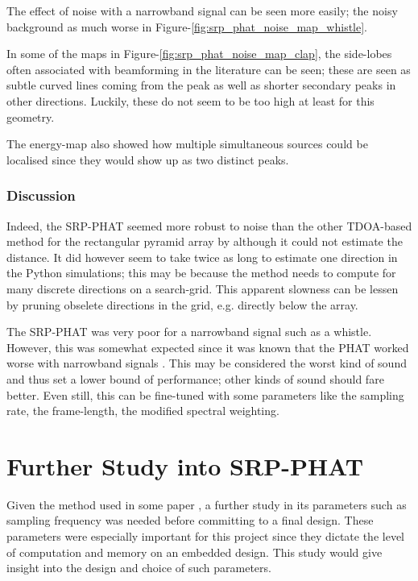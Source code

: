 \documentclass[notitlepage]{report}
\begin{document}
The effect of noise with a narrowband signal can be seen more easily; the noisy background as much worse in Figure-\ref{fig:srp_phat_noise_map_whistle}.

In some of the maps in Figure-\ref{fig:srp_phat_noise_map_clap}, the side-lobes often associated with beamforming in the literature can be seen; these are seen as subtle curved lines coming from the peak as well as shorter secondary peaks in other directions. Luckily, these do not seem to be too high at least for this geometry.

The energy-map also showed how multiple simultaneous sources could be localised since they would show up as two distinct peaks.

\subsubsection{Discussion}

Indeed, the SRP-PHAT seemed more robust to noise than the other TDOA-based method for the rectangular pyramid array by \cite{chen_sound_2019} although it could not estimate the distance. It did however seem to take twice as long to estimate one direction in the Python simulations; this may be because the method needs to compute for many discrete directions on a search-grid. This apparent slowness can be lessen by pruning obselete directions in the grid, e.g. directly below the array.

The SRP-PHAT was very poor for a narrowband signal such as a whistle. However, this was somewhat expected since it was known that the PHAT worked worse with narrowband signals \cite{valin_localization_2004} \cite{valin_robust_2007}. This may be considered the worst kind of sound and thus set a lower bound of performance; other kinds of sound should fare better. Even still, this can be fine-tuned with some parameters like the sampling rate, the frame-length, the modified spectral weighting. 

\section{Further Study into SRP-PHAT}

Given the method used in some paper \cite{valin_localization_2004}\cite{valin_robust_2007}\cite{manamperi_drone_2022}\cite{salvati_power_2019}\cite{basiri_-board_2016}, a further study in its parameters such as sampling frequency was needed before committing to a final design. These parameters were especially important for this project since they dictate the level of computation and memory on an embedded design. This study would give insight into the design and choice of such parameters.
\end{document}
